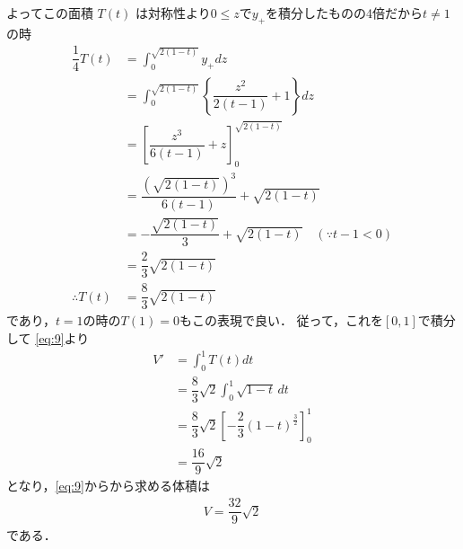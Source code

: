 \documentclass[../../main.tex]{subfiles}
\begin{document}
よってこの面積 $T(t)$ は対称性より$0 \le z$で$y_+$を積分したものの4倍だから$t \neq 1$の時
\begin{align}
  \dfrac{1}{4}T(t)
  &= \int_{0}^{\sqrt{2(1-t)}} y_{+} dz \\
  &= \int_{0}^{\sqrt{2(1-t)}} \left\{\dfrac{z^2}{2(t-1)}+1\right\} dz \\
  &= \left[\dfrac{z^3}{6(t-1)}+z\right]_{0}^{\sqrt{2(1-t)}} \\
  &= \dfrac{(\sqrt{2(1-t)})^3}{6(t-1)} + \sqrt{2(1-t)} \\
  &= -\dfrac{\sqrt{2(1-t)}}{3} + \sqrt{2(1-t)} \quad (\because t-1<0)\\
  &= \dfrac{2}{3}\sqrt{2(1-t)} \\
  \therefore
  T(t)
  &= \dfrac{8}{3}\sqrt{2(1-t)}
\end{align}
であり，$t=1$の時の$T(1)=0$もこの表現で良い．
従って，これを$[0,1]$で積分して
\cref{eq:9}より
\begin{align}
  V' &= \int_0^1 T(t) dt \\
  &= \dfrac{8}{3}\sqrt{2} \int_0^1 \sqrt{1-t} \, dt \\
  &= \dfrac{8}{3}\sqrt{2} \left[ -\dfrac{2}{3} (1-t)^{\frac{3}{2}} \right]_0^1 \\
  &= \dfrac{16}{9} \sqrt{2}
\end{align}
となり，\cref{eq:9}からから求める体積は
\begin{align}
  V = \dfrac{32}{9}\sqrt{2}
\end{align}
である．




\end{document}
